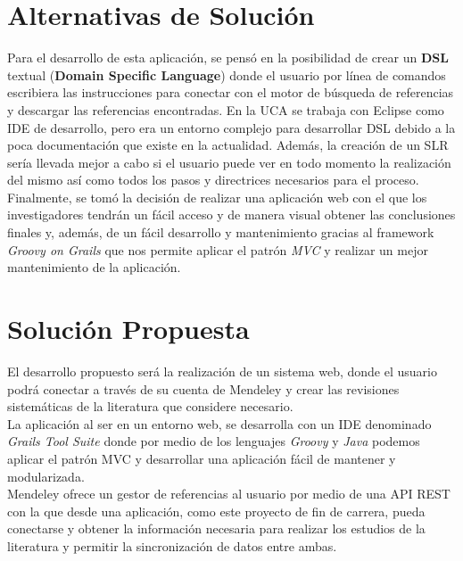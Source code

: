 \section{Alternativas de Solución}
Para el desarrollo de esta aplicación, se pensó en la posibilidad de crear un \textbf{DSL} textual (\textbf{Domain Specific Language}) donde el usuario por línea de comandos escribiera las instrucciones para conectar con el motor de búsqueda de referencias y descargar las referencias encontradas. En la UCA se trabaja con Eclipse como IDE de desarrollo, pero era un entorno complejo para desarrollar DSL debido a la poca documentación que existe en la actualidad. Además, la creación de un SLR sería llevada mejor a cabo si el usuario puede ver en todo momento la realización del mismo así como todos los pasos y directrices necesarios para el proceso.\\

Finalmente, se tomó la decisión de realizar una aplicación web con el que los investigadores tendrán un fácil acceso y de manera visual obtener las conclusiones finales y, además, de un fácil desarrollo y mantenimiento gracias al framework \textit{Groovy on Grails} que nos permite aplicar el patrón \textit{MVC} y realizar un mejor mantenimiento de la aplicación.

\section{Solución Propuesta}
El desarrollo propuesto será la realización de un sistema web, donde el usuario podrá conectar a través de su cuenta de Mendeley y crear las revisiones sistemáticas de la literatura que considere necesario.\\

La aplicación al ser en un entorno web, se desarrolla con un IDE denominado \textit{Grails Tool Suite} donde por medio de los lenguajes \textit{Groovy} y \textit{Java} podemos aplicar el patrón MVC y desarrollar una aplicación fácil de mantener y modularizada.\\

Mendeley ofrece un gestor de referencias al usuario por medio de una API REST con la que desde una aplicación, como este proyecto de fin de carrera, pueda conectarse y obtener la información necesaria para realizar los estudios de la literatura y permitir la sincronización de datos entre ambas.\\